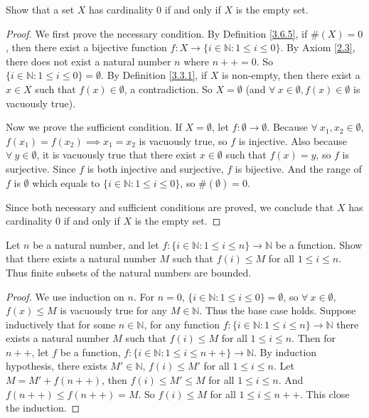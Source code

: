 \begin{exercise}\label{ex 3.6.2}
Show that a set \(X\) has cardinality \(0\) if and only if \(X\) is the empty set.
\end{exercise}

\begin{proof}
We first prove the necessary condition.
By Definition \ref{3.6.5}, if \(\#(X) = 0\), then there exist a bijective function \(f : X \to \{i \in \mathds{N} : 1 \leq i \leq 0\}\).
By Axiom \ref{2.3}, there does not exist a natural number \(n\) where \(n++ = 0\).
So \(\{i \in \mathds{N} : 1 \leq i \leq 0\} = \emptyset\).
By Definition \ref{3.3.1}, if \(X\) is non-empty, then there exist a \(x \in X\) such that \(f(x) \in \emptyset\), a contradiction.
So \(X = \emptyset\) (and \(\forall\ x \in \emptyset, f(x) \in \emptyset\) is vacuously true).

Now we prove the sufficient condition.
If \(X = \emptyset\), let \(f : \emptyset \to \emptyset\).
Because \(\forall\ x_1, x_2 \in \emptyset\), \(f(x_1) = f(x_2) \implies x_1 = x_2\) is vacuously true, so \(f\) is injective.
Also because \(\forall\ y \in \emptyset\), it is vacuously true that there exist \(x \in \emptyset\) such that \(f(x) = y\), so \(f\) is surjective.
Since \(f\) is both injective and surjective, \(f\) is bijective.
And the range of \(f\) is \(\emptyset\) which equals to \(\{i \in \mathds{N} : 1 \leq i \leq 0\}\), so \(\#(\emptyset) = 0\).

Since both necessary and sufficient conditions are proved, we conclude that \(X\) has cardinality \(0\) if and only if \(X\) is the empty set.
\end{proof}

\begin{exercise}\label{ex 3.6.3}
Let \(n\) be a natural number, and let \(f : \{i \in \mathds{N} : 1 \leq i \leq n\} \to \mathds{N}\) be a function.
Show that there exists a natural number \(M\) such that \(f(i) \leq M\) for all \(1 \leq i \leq n\).
Thus finite subsets of the natural numbers are bounded.
\end{exercise}

\begin{proof}
We use induction on \(n\).
For \(n = 0\), \(\{i \in \mathds{N} : 1 \leq i \leq 0\} = \emptyset\), so \(\forall\ x \in \emptyset\), \(f(x) \leq M\) is vacuously true for any \(M \in \mathds{N}\).
Thus the base case holds.
Suppose inductively that for some \(n \in \mathds{N}\), for any function \(f : \{i \in \mathds{N} : 1 \leq i \leq n\} \to \mathds{N}\) there exists a natural number \(M\) such that \(f(i) \leq M\) for all \(1 \leq i \leq n\).
Then for \(n++\), let \(f\) be a function, \(f : \{i \in \mathds{N} : 1 \leq i \leq n++\} \to \mathds{N}\).
By induction hypothesis, there exists \(M' \in \mathds{N}\), \(f(i) \leq M'\) for all \(1 \leq i \leq n\).
Let \(M = M' + f(n++)\), then \(f(i) \leq M' \leq M\) for all \(1 \leq i \leq n\).
And \(f(n++) \leq f(n++) = M\).
So \(f(i) \leq M\) for all \(1 \leq i \leq n++\).
This close the induction.
\end{proof}

